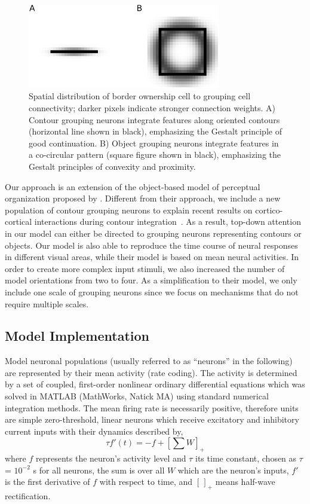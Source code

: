 \begin{figure}[htbp]
\centering
\includegraphics[width=0.75\textwidth]{Contour/figs/Fig2.eps}
\makeatletter
\let\@currsize\normalsize
\caption{Spatial distribution of border ownership cell to grouping cell connectivity; darker pixels indicate stronger connection weights. A) Contour grouping neurons integrate features along oriented contours (horizontal line shown in black), emphasizing the Gestalt principle of good continuation. B) Object grouping neurons integrate features in a co-circular pattern (square figure shown in black), emphasizing the Gestalt principles of convexity and proximity.} 
\label{Fig:BG_projections}
\end{figure}

Our approach is an extension of the object-based model of perceptual organization proposed by \cite{Mihalas_etal11b}. Different from their approach, we include a new population of contour grouping neurons to explain recent results on cortico-cortical interactions during contour integration~\citep{Chen_etal14}. As a result, top-down attention in our model can either be directed to grouping neurons representing contours or objects. Our model is also able to reproduce the time course of neural responses in different visual areas, while their model is based on mean neural activities. In order to create more complex input stimuli, we also increased the number of model orientations from two to four. As a simplification to their model, we only include one scale of grouping neurons since we focus on mechanisms that do not require multiple scales.

\subsection{Model Implementation}
\label{sec:implementation}

Model neuronal populations (usually referred to as ``neurons'' in the
following) are represented  by their mean  activity (rate coding). The activity is determined by a set of coupled, first-order nonlinear ordinary differential equations which was solved in MATLAB (MathWorks, Natick MA) using standard numerical integration methods. The mean firing rate is necessarily positive, therefore units are simple zero-threshold, linear neurons which receive excitatory and inhibitory current inputs with their dynamics described by,
\begin{equation}
\label{eq:1}
\tau f'(t) = -f + \left[ \sum W \right]_{+}
\end{equation}
where $f$ represents the neuron's activity level and $\tau$ its time
constant, chosen as $\tau$ = $10^{-2}$ s for all neurons,  the sum is over all $W$ which are the neuron's inputs, $f'$ is the first derivative of $f$ with respect to time, and $[\,]_{+}$ means half-wave rectification.


